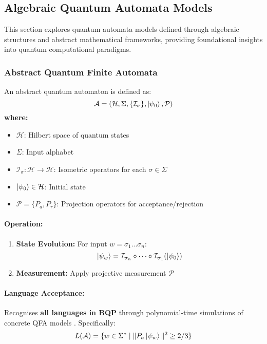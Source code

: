 \subsection{Algebraic Quantum Automata Models}
\label{sec:abstract-qfa}

This section explores quantum automata models defined through algebraic structures and abstract mathematical frameworks, providing foundational insights into quantum computational paradigms.

\subsubsection{Abstract Quantum Finite Automata}
\label{subsec:abstract-qfa}

\begin{definition}
An abstract quantum automaton is defined as:
\[
\mathcal{A} = (\mathcal{H}, \Sigma, \{\mathcal{I}_\sigma\}, \ket{\psi_0}, \mathcal{P})
\]
\textbf{where:}
\begin{itemize}
    \item $\mathcal{H}$: Hilbert space of quantum states
    \item $\Sigma$: Input alphabet
    \item $\mathcal{I}_\sigma: \mathcal{H} \rightarrow \mathcal{H}$: Isometric operators for each $\sigma \in \Sigma$
    \item $\ket{\psi_0} \in \mathcal{H}$: Initial state
    \item $\mathcal{P} = \{P_a, P_r\}$: Projection operators for acceptance/rejection
\end{itemize}
\end{definition}

\paragraph{Operation:}
\begin{enumerate}
    \item \textbf{State Evolution:} For input $w = \sigma_1...\sigma_n$:
    \[
    \ket{\psi_w} = \mathcal{I}_{\sigma_n} \circ \cdots \circ \mathcal{I}_{\sigma_1} (\ket{\psi_0})
    \]
    \item \textbf{Measurement:} Apply projective measurement $\mathcal{P}$
\end{enumerate}

\paragraph{Language Acceptance:}
Recognises \textbf{all languages in BQP} through polynomial-time simulations of concrete QFA models \cite{manin1980computable, gruska2005}. Specifically:
\[
L(\mathcal{A}) = \{w \in \Sigma^* \mid \|P_a\ket{\psi_w}\|^2 \geq 2/3\}
\]

